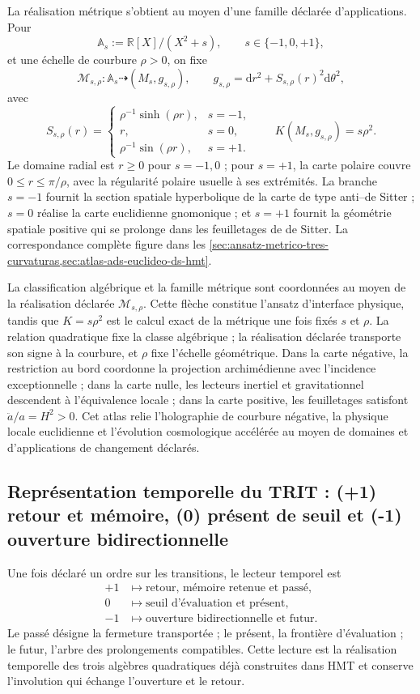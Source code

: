 La réalisation métrique s'obtient au moyen d'une famille déclarée d'applications.
Pour
\[
 \mathbb A_s:=\mathbb R[X]/(X^2+s),
 \qquad s\in\{-1,0,+1\},
\]
et une échelle de courbure \(\rho>0\), on fixe
\[
 \mathcal M_{s,\rho}:\mathbb A_s\dashrightarrow
 (M_s,g_{s,\rho}),
 \qquad
 g_{s,\rho}=\mathrm d r^2+S_{s,\rho}(r)^2\mathrm d\theta^2,
\]
avec
\[
 S_{s,\rho}(r)=
 \begin{cases}
  \rho^{-1}\sinh(\rho r),&s=-1,\\
  r,&s=0,\\
  \rho^{-1}\sin(\rho r),&s=+1.
 \end{cases}
 \qquad
 K(M_s,g_{s,\rho})=s\rho^2.
\]
Le domaine radial est \(r\geq0\) pour \(s=-1,0\) ; pour \(s=+1\), la carte
polaire couvre \(0\leq r\leq\pi/\rho\), avec la régularité polaire usuelle à ses
extrémités. La branche \(s=-1\) fournit la section spatiale hyperbolique de la
carte de type anti--de Sitter ; \(s=0\) réalise la carte euclidienne gnomonique ;
et \(s=+1\) fournit la géométrie spatiale positive qui se prolonge dans
les feuilletages de de Sitter. La correspondance complète figure dans les
\cref{sec:ansatz-metrico-tres-curvaturas,sec:atlas-ads-euclideo-ds-hmt}.

La classification algébrique et la famille métrique sont coordonnées au moyen de
la réalisation déclarée \(\mathcal M_{s,\rho}\). Cette flèche constitue
l'ansatz d'interface physique, tandis que
\(K=s\rho^2\) est le calcul exact de la métrique une fois fixés \(s\) et
\(\rho\). La relation quadratique fixe la classe algébrique ; la réalisation
déclarée transporte son signe à la courbure, et \(\rho\) fixe l'échelle
géométrique. Dans la carte négative, la restriction au bord coordonne la
projection archimédienne avec l'incidence exceptionnelle ; dans la carte nulle, les
lecteurs inertiel et gravitationnel descendent à l'équivalence locale ; dans la
carte positive, les feuilletages satisfont \(\ddot a/a=H^2>0\). Cet atlas
relie l'holographie de courbure négative, la physique locale euclidienne et
l'évolution cosmologique accélérée au moyen de domaines et d'applications de changement
déclarés.

\subsection{Représentation temporelle du TRIT : (+1) retour et mémoire, (0) présent de seuil et (-1) ouverture bidirectionnelle}

Une fois déclaré un ordre sur les transitions, le lecteur temporel est
\[
\begin{aligned}
 +1&\longmapsto\text{retour, mémoire retenue et passé},\\
 0&\longmapsto\text{seuil d'évaluation et présent},\\
 -1&\longmapsto\text{ouverture bidirectionnelle et futur}.
\end{aligned}
\]
Le passé désigne la fermeture transportée ; le présent, la frontière
d'évaluation ; le futur, l'arbre des prolongements compatibles. Cette lecture
est la réalisation temporelle des trois algèbres quadratiques déjà construites
dans HMT et conserve l'involution qui échange l'ouverture et le retour.

